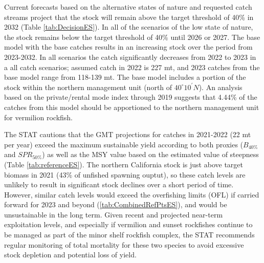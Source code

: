 \documentclass[
  english,
  a4paper,
]{article}
\begin{document}
Current forecasts based on the alternative states of nature and requested catch streams project that the stock will remain above the target threshold of 40\% in 2032 (Table \ref{tab:DecisionES}). In all of the scenarios of the low state of nature,\\
the stock remains below the target threshold of 40\% until 2026 or 2027.
The base model with the base catches results in an increasing stock over the period from
2023-2032. In all scenarios the catch significantly decreases from 2022 to 2023 in a
all catch scenarios; assumed catch in 2022 is 227 mt, and 2023 catches from the base
model range from 118-139 mt. The base model includes a portion of the stock within
the northern management unit (north of $40^\circ 10^\prime N$). An analysis based on the private/rental
mode index through 2019 suggests
that 4.44\% of the catches from this model should be apportioned to the northern
management unit for vermilion rockfish.

The STAT cautions that the GMT projections for catches in 2021-2022 (22 mt per year) exceed the maximum sustainable yield according to both proxies (\(B_{40\%}\) and \(SPR_{50\%}\)) as well as the MSY value based on the estimated value of steepness (Table \ref{tab:referenceES}). The northern California stock is just above target biomass in 2021 (43\% of unfished spawning ouptut), so these catch levels are unlikely to result in significant stock declines over a short period of time. However, similar catch levels would exceed the overfishing limits (OFL) if carried forward for 2023 and beyond (\ref{tab:CombinedRefPtsES}), and would be unsustainable in the long term. Given recent and projected near-term exploitation levels, and especially if vermilion and sunset rockfishes continue to be managed as part of the minor shelf rockfish complex, the STAT recommends regular monitoring of total mortality for these two species to avoid excessive stock depletion and potential loss of yield.
\end{document}
